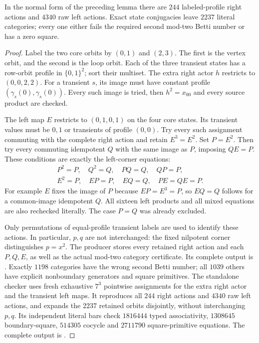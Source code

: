 \begin{lemma}
\label{C:six-four-seven-nilpotent-control}
In the normal form of the preceding lemma there are
$244$ labeled-profile right actions and $4340$ raw
left actions.  Exact state conjugacies leave $2237$
literal categories; every one either fails the required
second mod-two Betti number or has a zero square.
\end{lemma}
\begin{proof}
Label the two core orbits by $(0,1)$ and $(2,3)$.
The first is the vertex orbit, and the second is the
loop orbit.  Each of the three transient states has
a row-orbit profile in $\{0,1\}^2$; sort their multiset.
The extra right actor $h$ restricts to $(0,0,2,2)$.
For a transient $s$, its image must have constant profile
$(\gamma_s(0),\gamma_s(0))$.  Every such image is tried,
then $h^2=x_{00}$ and every source product are checked.

The left map $E$ restricts to $(0,1,0,1)$ on the
four core states.  Its transient values must be
$0,1$ or transients of profile $(0,0)$.
Try every such assignment commuting with the complete
right action and retain $E^3=E^2$.  Set $P=E^2$.
Then try every commuting idempotent $Q$ with the same
image as $P$, imposing $QE=P$.  These conditions are
exactly the left-corner equations:
\[
\begin{gathered}
 P^2=P,\quad Q^2=Q,\quad PQ=Q,\quad QP=P,\\
 E^2=P,\quad EP=P,\quad EQ=Q,\quad PE=QE=P.
\end{gathered}
\]
For example $E$ fixes the image of $P$ because
$EP=E^3=P$, so $EQ=Q$ follows for a common-image
idempotent $Q$.  All sixteen left products and all
mixed equations are also rechecked literally.
The case $P=Q$ was already excluded.

Only permutations of equal-profile transient labels
are used to identify these actions.  In particular,
$p,q$ are not interchanged: the fixed nilpotent corner
distinguishes $p=x^2$.  The producer
stores every retained right action and each $P,Q,E$,
as well as the actual mod-two category certificate.
Its complete output is
.
Exactly $1198$ categories have the wrong second
Betti number; all $1039$ others have explicit
nonboundary generators and square primitives.
The standalone checker
uses fresh exhaustive $7^3$ pointwise assignments for
the extra right actor and the transient left maps.
It reproduces all $244$ right actions and $4340$
raw left actions, and expands the $2237$ retained
orbits disjointly, without interchanging $p,q$.
Its independent literal bars check $1816444$ typed
associativity, $1308645$ boundary-square, $514305$
cocycle and $2711790$ square-primitive equations.
The complete output is
.
\end{proof}

